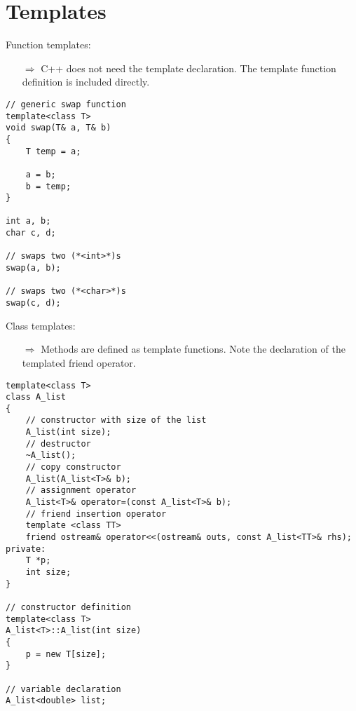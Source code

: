 \documentclass[10pt]{article}
\begin{document}
\section{Templates}
\small
Function templates:
\begin{enumerate}
\item[$\Rightarrow$] C++ does not need the template declaration.
The template function definition is included directly.
\end{enumerate}
\begin{lstlisting}
// generic swap function
template<class T>
void swap(T& a, T& b)
{
    T temp = a;
    
    a = b;
    b = temp;
}

int a, b;
char c, d;

// swaps two (*<int>*)s
swap(a, b);

// swaps two (*<char>*)s
swap(c, d);
\end{lstlisting}
Class templates:
\begin{enumerate}
\item[$\Rightarrow$] Methods are defined as template functions.
Note the declaration of the templated friend operator.
\end{enumerate}
\begin{lstlisting}
template<class T>
class A_list
{
    // constructor with size of the list
    A_list(int size);
    // destructor
    ~A_list();
    // copy constructor
    A_list(A_list<T>& b);
    // assignment operator
    A_list<T>& operator=(const A_list<T>& b);
    // friend insertion operator
    template <class TT>
    friend ostream& operator<<(ostream& outs, const A_list<TT>& rhs);
private:
    T *p;
    int size;
}

// constructor definition
template<class T>
A_list<T>::A_list(int size)
{
    p = new T[size];
}

// variable declaration
A_list<double> list;
\end{lstlisting}
%
%
\end{document}
